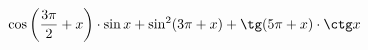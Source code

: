 \begin{ex}[type=expression]
	\begin{condition}
		\( \cos\left( \dfrac{3\pi}{2}+x \right)\cdot\sin x + \sin^2(3\pi+x)+\tg(5\pi+x)\cdot\ctg x \)
	\end{condition}
\end{ex}